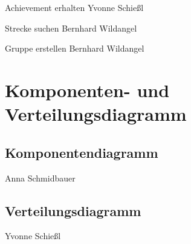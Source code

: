 \documentclass[a4paper, 12pt]{article}
\begin{document}
{\Large Achievement erhalten}
Yvonne Schießl
\begin{figure}[H] 
\centering
\end{figure}

{\Large Strecke suchen}
Bernhard Wildangel
\begin{figure}[H] 
\centering
\end{figure}
\newpage

{\Large Gruppe erstellen}
Bernhard Wildangel
\begin{figure}[H] 
\centering
\end{figure}

\newpage
\section{Komponenten- und Verteilungsdiagramm}
\subsection{Komponentendiagramm}

Anna Schmidbauer
\begin{figure}[H] 
\centering
\end{figure}

\newpage
\subsection{Verteilungsdiagramm}

Yvonne Schießl
\begin{figure}[H] 
\centering
\end{figure}
\newpage
\end{document}
